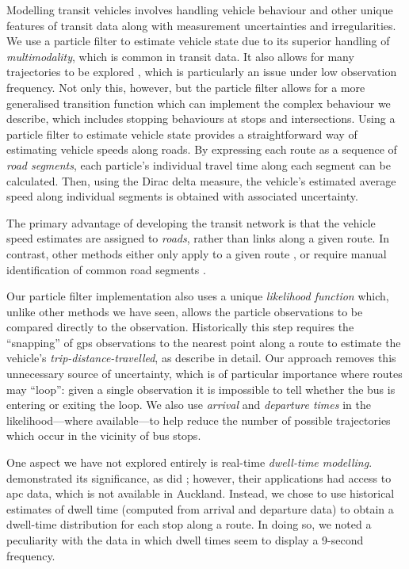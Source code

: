 Modelling transit vehicles involves handling vehicle behaviour and other unique features of transit data along with measurement uncertainties and irregularities. We use a particle filter to estimate vehicle state due to its superior handling of \emph{multimodality}, which is common in transit data. It also allows for many trajectories to be explored \citep{Hans_2015}, which is particularly an issue under low observation frequency. Not only this, however, but the particle filter allows for a more generalised transition function which can implement the complex behaviour we describe, which includes stopping behaviours at stops and intersections. Using a particle filter to estimate vehicle state provides a straightforward way of estimating vehicle speeds along roads. By expressing each route as a sequence of \emph{road segments}, each particle's individual travel time along each segment can be calculated. Then, using the Dirac delta measure, the vehicle's estimated average speed along individual segments is obtained with associated uncertainty.


The primary advantage of developing the transit network is that the vehicle speed estimates are assigned to \emph{roads}, rather than links along a given route. In contrast, other methods either only apply to a given route \citep{Yu_2010,Celan_2017,Chang_2010}, or require manual identification of common road segments \citep{Yu_2011,Yin_2017}.


Our particle filter implementation also uses a unique \emph{likelihood function} which, unlike other methods we have seen, allows the particle observations to be compared directly to the observation. Historically this step requires the ``snapping'' of \gls{gps} observations to the nearest point along a route to estimate the vehicle's \emph{trip-distance-travelled}, as \citet{Cathey_2003} describe in detail. Our approach removes this unnecessary source of uncertainty, which is of particular importance where routes may ``loop'': given a single observation it is impossible to tell whether the bus is entering or exiting the loop. We also use \emph{arrival} and \emph{departure times} in the likelihood---where available---to help reduce the number of possible trajectories which occur in the vicinity of bus stops.


One aspect we have not explored entirely is real-time \emph{dwell-time modelling}. \citet{Shalaby_2004} demonstrated its significance, as did \citet{Hans_2015}; however, their applications had access to \gls{apc} data, which is not available in Auckland. Instead, we chose to use historical estimates of dwell time (computed from arrival and departure data) to obtain a dwell-time distribution for each stop along a route. In doing so, we noted a peculiarity with the data in which dwell times seem to display a 9-second frequency.


